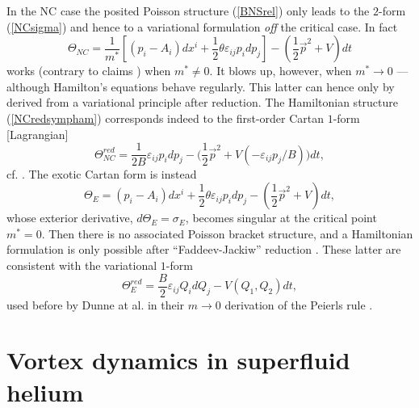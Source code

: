 \documentclass[a4paper,11pt]{article}
\let\ssection=\section
\renewcommand{\section}{\setcounter{equation}{0}\ssection}
\newcommand{\half}{{\scriptstyle{\frac{1}{2}}}}
\def\vp{{\vec p}}
\begin{document}
In the NC case the posited Poisson structure (\ref{BNSrel})
only leads to the $2$-form (\ref{NCsigma}) and hence to a
variational formulation {\it off} the critical case. In fact
\begin{equation}
     \Theta_{NC}=\frac{1}{m^*}
     \left[(p_{i}-A_{i})dx^i+
     \half\theta\varepsilon_{ij}p_{i}dp_{j}\right]
     -(\half{\vp}^{2}+V)dt
\label{NCcartan}
\end{equation}
works (contrary to claims \cite{ACAT}) when $m^*\neq0$.
It blows up, however, when $m^*\to0$ --- although
   Hamilton's equations behave regularly. This latter can hence
   only by derived from a variational principle
after reduction. The Hamiltonian structure
(\ref{NCredsympham}) corresponds indeed to the first-order
Cartan $1$-form [Lagrangian]
\begin{equation}
     \Theta_{NC}^{red}=\frac{1}{2B}\varepsilon_{ij}p_{i} dp_{j}
     -\Big(\half\vp^2+V(-\varepsilon_{ij}p_{j}/B)\Big)dt,
     \label{NCredcartan}
\end{equation}
cf. \cite{ACAT}.
The exotic Cartan form is instead
\begin{equation}
     \Theta_{E}=(p_{i}-A_{i})dx^i+
     \half\theta\varepsilon_{ij}p_{i}dp_{j}
     -(\half{\vp}^{2}+V)dt,
\label{Ecartan}
\end{equation}
whose exterior derivative, $d\Theta_{E}=\sigma_{E}$,
becomes singular at the critical point $m^*=0$.
  Then there is no associated Poisson bracket
structure, and a Hamiltonian formulation is only possible after
``Faddeev-Jackiw'' reduction \cite{FaJa, DH}. These latter
are consistent with the
variational $1$-form
\begin{equation}
     \Theta_{E}^{red}=\frac{B}{2}\varepsilon_{ij}Q_{i} dQ_{j}
     -V(Q_{1}, Q_{2})dt,
     \label{Eredcartan}
\end{equation}
used before by Dunne at al. in their $m\to0$
derivation of the Peierls rule \cite{DJT}.

\section{Vortex dynamics in superfluid helium}
\end{document}

